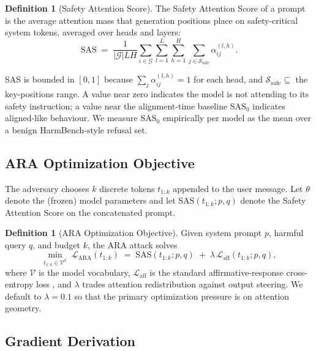 \documentclass[sigconf,anonymous=false,review=false]{acmart}
\theoremstyle{definition}
\newtheorem{definition}[theorem]{Definition}
\theoremstyle{remark}
\newcommand{\SAS}{\mathrm{SAS}}
\begin{document}
\begin{definition}[Safety Attention Score]
\label{def:sas}
The Safety Attention Score of a prompt is the average attention mass that generation positions place on safety-critical system tokens, averaged over heads and layers:
\[
\SAS \;=\; \frac{1}{|\mathcal{G}| L H} \sum_{i \in \mathcal{G}} \sum_{l=1}^{L} \sum_{h=1}^{H} \sum_{j \in \mathcal{S}_{\text{safe}}} \alpha^{(l,h)}_{ij}.
\]
\end{definition}

SAS is bounded in $[0,1]$ because $\sum_j \alpha^{(l,h)}_{ij} = 1$ for each head, and $\mathcal{S}_{\text{safe}} \subseteq$ the key-positions range. A value near zero indicates the model is not attending to its safety instruction; a value near the alignment-time baseline $\SAS_0$ indicates aligned-like behaviour. We measure $\SAS_0$ empirically per model as the mean over a benign HarmBench-style refusal set.

\subsection{ARA Optimization Objective}

The adversary chooses $k$ discrete tokens $t_{1{:}k}$ appended to the user message. Let $\theta$ denote the (frozen) model parameters and let $\SAS(t_{1:k}; p, q)$ denote the Safety Attention Score on the concatenated prompt.

\begin{definition}[ARA Optimization Objective]
\label{def:ara}
Given system prompt $p$, harmful query $q$, and budget $k$, the ARA attack solves
\begin{equation}
\min_{t_{1:k} \in \mathcal{V}^{k}} \; \mathcal{L}_{\mathrm{ARA}}(t_{1:k}) \;=\; \SAS(t_{1:k}; p, q) \;+\; \lambda \, \mathcal{L}_{\mathrm{aff}}(t_{1:k}; p, q),
\label{eq:ara_obj}
\end{equation}
where $\mathcal{V}$ is the model vocabulary, $\mathcal{L}_{\mathrm{aff}}$ is the standard affirmative-response cross-entropy loss \cite{zou2023universal}, and $\lambda$ trades attention redistribution against output steering. We default to $\lambda = 0.1$ so that the primary optimization pressure is on attention geometry.
\end{definition}

\subsection{Gradient Derivation}
\end{document}
